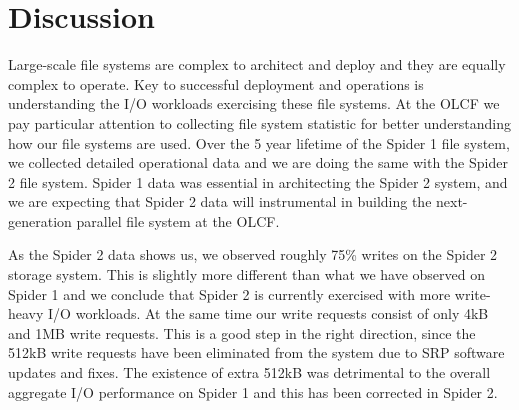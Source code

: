 \section{Discussion}
\label{sec:discuss} 

Large-scale file systems are complex to architect and deploy and they are
equally complex to operate. Key to successful deployment and operations is
understanding the I/O workloads exercising these file systems. At the OLCF we
pay particular attention to collecting file system statistic for better
understanding how our file systems are used. Over the 5 year lifetime of the
Spider 1 file system, we collected detailed operational data and we are doing
the same with the Spider 2 file system. Spider 1 data was essential in
architecting the Spider 2 system, and we are expecting that Spider 2 data will
instrumental in building the next-generation parallel file system at the OLCF.
 

As the Spider 2 data shows us, we observed roughly 75\% writes on the Spider 2
storage system. This is slightly more different than what we have observed on
Spider 1 and we conclude that Spider 2 is currently exercised with more
write-heavy I/O workloads. At the same time our write requests consist of only
4kB and 1MB write requests. This is a good step in the right direction, since
the 512kB write requests have been eliminated from the system due to SRP
software updates and fixes. The existence of extra 512kB was detrimental to the
overall aggregate I/O performance on Spider 1 and this has been corrected in
Spider 2.  
